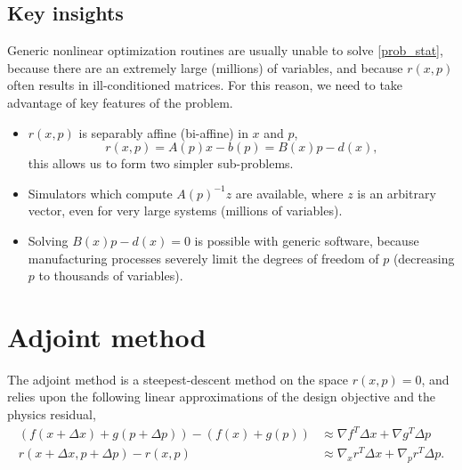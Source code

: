 \documentclass{article}
\begin{document}
\subsection{Key insights}
Generic nonlinear optimization routines are usually unable
    to solve \eqref{prob_stat},
    because there are an extremely large (millions) of variables, 
    and because $r(x,p)$ often results in ill-conditioned matrices.
For this reason, we need to take advantage of key features of the problem.
\begin{itemize}
\item $r(x,p)$ is separably affine (bi-affine) in $x$ and $p$,
    \begin{equation}
    r(x,p) = A(p)x - b(p) = B(x) p - d(x),
    \end{equation}
        this allows us to form two simpler sub-problems.
\item Simulators which compute $A(p)^{-1} z$ are available,
        where $z$ is an arbitrary vector, 
        even for very large systems (millions of variables).
\item Solving $B(x) p - d(x) = 0$ is possible with generic software, 
        because manufacturing processes severely limit
        the degrees of freedom of $p$ 
        (decreasing $p$ to thousands of variables).
\end{itemize}
    


\section{Adjoint method}
The adjoint method is a steepest-descent method
    on the space $r(x,p) = 0$,
    and relies upon the following linear approximations
    of the design objective and the physics residual,
    \begin{subequations}\begin{align}
    (f(x + \Delta x) + g(p + \Delta p)) - (f(x) + g(p)) &\approx
        \nabla f^T \Delta x + \nabla g^T \Delta p \label{d lin} \\ 
    r(x + \Delta x, p + \Delta p) - r(x, p) &\approx
        \nabla_x r^T \Delta x + \nabla_p r^T \Delta p. \label{r lin}
    \end{align}\end{subequations}
\end{document}

